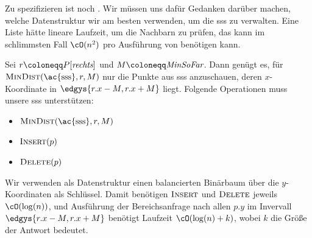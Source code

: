 \documentclass[language=ngerman,algolist,acrolist]{TemplateLecture}
\begin{document}
\begin{algorithm}[h]
    \caption{\textsc{FindClosestPair-2D}}
    \begin{algorithmic}[1]
            \Else{}
            \EndIf{}
        \EndWhile{}
        \State{\Return{$\MinSF$}}
    \end{algorithmic}
\end{algorithm}



Zu spezifizieren ist noch \MinDist. Wir müssen uns dafür Gedanken darüber machen, welche Datenstruktur wir am besten verwenden, um die \ac{sss} zu verwalten. Eine Liste hätte lineare Laufzeit, um die Nachbarn zu prüfen, das kann im schlimmsten Fall $\cO(n^2)$ pro Ausführung von \MinDist benötigen kann.

Sei $r \coloneqq P[\rechts]$ und $M \coloneqq \MinSF$. Dann genügt es, für $\MinDist(\text{\ac{sss}}, r, M)$ nur die Punkte aus \ac{sss} anzuschauen, deren $x$-Koordinate in $\edgys{r.x - M, r.x + M}$ liegt. Folgende Operationen muss unsere \ac{sss} unterstützen:
\begin{itemize}
    \item $\MinDist(\text{\ac{sss}}, r, M)$
    \item $\textsc{Insert}(p)$
    \item $\textsc{Delete}(p)$
\end{itemize}
Wir verwenden als Datenstruktur einen balancierten Binärbaum über die $y$-Koordinaten als Schlüssel. Damit benötigen $\textsc{Insert}$ und $\textsc{Delete}$ jeweils $\cO(\log(n))$, und Ausführung der Bereichsanfrage nach allen $p.y$ im Invervall $\edgys{r.x - M, r.x + M}$ benötigt Laufzeit $\cO(\log(n) + k)$, wobei $k$ die Größe der Antwort bedeutet.
\end{document}
